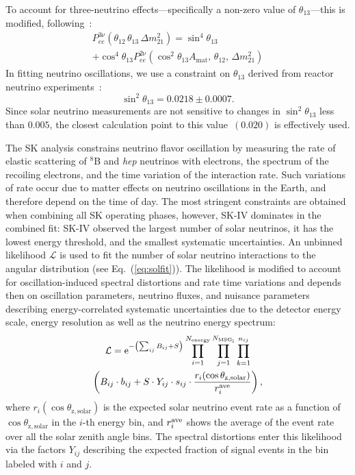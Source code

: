 \documentclass[aps,prd,reprint,superscriptaddress,floatfix,altaffilletter,nofootinbib]{revtex4-2}
\begin{document}
To account for three-neutrino effects---specifically a non-zero value of $\theta_{13}$---this is modified, following~\cite{Fogli:2000bk}: \begin{multline}
    P_{ee}^{\mathrm{3\nu}}(\theta_{12}\,\theta_{13}\,\Delta m^2_{21})=  \sin^{4}\theta_{13}\\
    +\cos^{4}\theta_{13}
    P_{ee}^{\mathrm{2\nu}}\left(\cos^{2}\theta_{13} A_{\mathrm{mat}},\, \theta_{12},\, \Delta m^{2}_{21}\right) 
\end{multline}
In fitting neutrino oscillations, we use a constraint on $\theta_{13}$ derived from reactor neutrino experiments~\cite{Zyla:2020zbs}: \begin{equation}
    \sin^{2}\theta_{13} = 0.0218\pm0.0007.
\end{equation}
Since solar neutrino measurements are not sensitive to changes in $\sin^2\theta_{13}$ less than $0.005$, the closest calculation point to this value~$(0.020)$ is effectively used.

The SK analysis constrains neutrino flavor oscillation by measuring the rate of elastic scattering of $^{8}$B and {\it hep} neutrinos with electrons, the spectrum of the recoiling electrons, and the time variation of the interaction rate. Such variations of rate occur due to matter effects on neutrino oscillations in the Earth, and therefore depend on the time of day. The most stringent constraints are obtained when combining all SK operating phases, however, SK-IV dominates in the combined fit: SK-IV observed the largest number of solar neutrinos, it has the lowest energy threshold, and the smallest systematic uncertainties.
An unbinned likelihood $\mathcal{L}$ is used to fit the number of solar neutrino interactions to the angular distribution (see Eq.~(\ref{eq:solfit})). The likelihood is modified to account for oscillation-induced spectral distortions and rate time variations and depends then on oscillation parameters, neutrino fluxes, and nuisance parameters describing energy-correlated systematic uncertainties due to the detector energy scale, energy resolution as well as the neutrino energy spectrum:
\begin{multline}
    \mathcal{L} =  \mathrm{e}^{- \left( \sum_{ij} B_{ij} + S\right)} \prod_{i=1}^{N_{\rm{energy}}} \prod_{j=1}^{N_{\rm{MSG}_i}} \prod_{k=1}^{n_{ij}} \\
 \left( B_{ij}\cdot b_{ij} + S \cdot Y_{ij}  \cdot  s_{ij} \cdot \frac{r_i(\cos \theta_{\mathrm{z,solar}})}{r^{\rm{\tiny ave}}_i}   \right),
\label{eq:time1}
\end{multline}
where $r_i(\cos \theta_{\mathrm{z,solar}})$ is the expected solar neutrino event rate as a function of $\cos \theta_{\mathrm{z,solar}}$ 
in the $i$-th energy bin, 
and $r_{i}^{\rm{\tiny ave}}$ shows the average of the event rate over all the solar zenith angle bins. The spectral distortions enter this likelihood via the factors $Y_{ij}$ describing the expected fraction of signal events in the bin labeled with $i$ and $j$.
\end{document}
